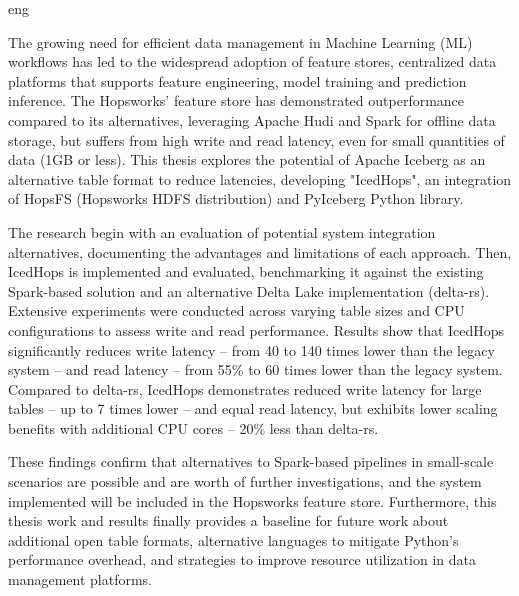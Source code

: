  \markboth{\abstractname}{}
\begin{scontents}[store-env=lang]
eng
\end{scontents}



\begin{scontents}[store-env=abstracts,print-env=true]
The growing need for efficient data management in Machine Learning (ML) workflows has led to the widespread adoption of feature stores, centralized data platforms that supports feature engineering, model training and prediction inference. The Hopsworks' feature store has demonstrated outperformance compared to its alternatives, leveraging Apache Hudi and Spark for offline data storage, but suffers from high write and read latency, even for small quantities of data (1GB or less). This thesis explores the potential of Apache Iceberg as an alternative table format to reduce latencies, developing "IcedHops", an integration of HopsFS (Hopsworks HDFS distribution) and PyIceberg Python library.

The research begin with an evaluation of potential system integration alternatives, documenting the advantages and limitations of each approach. Then, IcedHops is implemented and evaluated, benchmarking it against the existing Spark-based solution and an alternative Delta Lake implementation (delta-rs). Extensive experiments were conducted across varying table sizes and CPU configurations to assess write and read performance. Results show that IcedHops significantly reduces write latency -- from 40 to 140 times lower than the legacy system -- and read latency -- from 55\% to 60 times lower than the legacy system. Compared to delta-rs, IcedHops demonstrates reduced write latency for large tables -- up to 7 times lower -- and equal read latency, but exhibits lower scaling benefits with additional CPU cores -- 20\% less than delta-rs.

These findings confirm that alternatives to Spark-based pipelines in small-scale scenarios are possible and are worth of further investigations, and the system implemented will be included in the Hopsworks feature store. Furthermore, this thesis work and results finally provides a baseline for future work about additional open table formats, alternative languages to mitigate Python's performance overhead, and strategies to improve resource utilization in data management platforms.


\end{scontents}
